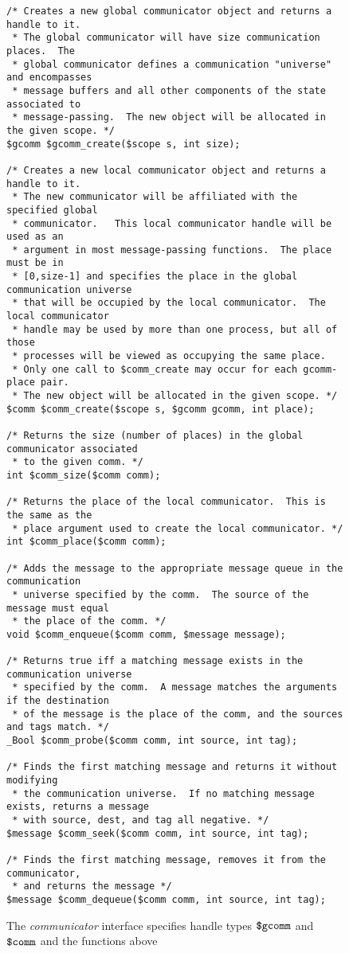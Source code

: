 \begin{figure}
  \begin{small}
\begin{verbatim}
/* Creates a new global communicator object and returns a handle to it.
 * The global communicator will have size communication places.  The
 * global communicator defines a communication "universe" and encompasses
 * message buffers and all other components of the state associated to
 * message-passing.  The new object will be allocated in the given scope. */
$gcomm $gcomm_create($scope s, int size);

/* Creates a new local communicator object and returns a handle to it.
 * The new communicator will be affiliated with the specified global
 * communicator.   This local communicator handle will be used as an
 * argument in most message-passing functions.  The place must be in
 * [0,size-1] and specifies the place in the global communication universe
 * that will be occupied by the local communicator.  The local communicator
 * handle may be used by more than one process, but all of those
 * processes will be viewed as occupying the same place.
 * Only one call to $comm_create may occur for each gcomm-place pair.
 * The new object will be allocated in the given scope. */
$comm $comm_create($scope s, $gcomm gcomm, int place);

/* Returns the size (number of places) in the global communicator associated
 * to the given comm. */
int $comm_size($comm comm);

/* Returns the place of the local communicator.  This is the same as the
 * place argument used to create the local communicator. */
int $comm_place($comm comm);

/* Adds the message to the appropriate message queue in the communication
 * universe specified by the comm.  The source of the message must equal
 * the place of the comm. */
void $comm_enqueue($comm comm, $message message);

/* Returns true iff a matching message exists in the communication universe
 * specified by the comm.  A message matches the arguments if the destination
 * of the message is the place of the comm, and the sources and tags match. */
_Bool $comm_probe($comm comm, int source, int tag);

/* Finds the first matching message and returns it without modifying
 * the communication universe.  If no matching message exists, returns a message
 * with source, dest, and tag all negative. */
$message $comm_seek($comm comm, int source, int tag);

/* Finds the first matching message, removes it from the communicator,
 * and returns the message */ 
$message $comm_dequeue($comm comm, int source, int tag);
\end{verbatim}
  \end{small}
  \caption{The \emph{communicator} interface specifies handle 
    types $\mbox{\texttt{\${}gcomm}}$ and $\mbox{\texttt{\${}comm}}$ and the functions above}
  \label{fig:comm}
\end{figure}

